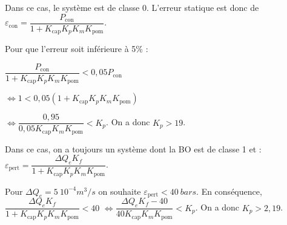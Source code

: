\ifprof
\begin{corrige}
Dans ce cas, le système est de classe 0. L'erreur statique est donc de $\varepsilon_{\text{con}}=\dfrac{P_{\text{con}}}{1+K_{\text{cap}}K_pK_mK_{\text{pom}}}$.
\end{corrige}
\else
\fi

\ifprof
\begin{corrige}

Pour que l'erreur soit inférieure à 5\% : 

$\dfrac{P_{\text{con}}}{1+K_{\text{cap}}K_pK_mK_{\text{pom}}}<0,05 P_{\text{con}}$

$\Leftrightarrow 1<0,05 \left(1+K_{\text{cap}}K_pK_mK_{\text{pom}}\right)$

$\Leftrightarrow \dfrac{0,95}{0,05K_{\text{cap}}K_mK_{\text{pom}}}<K_p$.
On a donc $K_p>19$.
\end{corrige} 
\else
\fi

\ifprof
\begin{corrige}
Dans ce cas, on a toujours un système dont la BO est de classe 1 et : 
$\varepsilon_{\text{pert}}=\dfrac{\Delta Q_e K_f}{1+K_{\text{cap}}K_pK_mK_{\text{pom}}}$.

\end{corrige}
\else
\fi

\ifprof
\begin{corrige}
Pour $\Delta Q_e = \SI{5}{10^{-4} m^3/s}$ on souhaite $\varepsilon_{\text{pert}} < \SI{40}{bars}$. En conséquence, 
$\dfrac{\Delta Q_e K_f}{1+K_{\text{cap}}K_pK_mK_{\text{pom}}} <40$ 
$\Leftrightarrow  \dfrac{\Delta Q_e K_f -40}{40K_{\text{cap}}K_mK_{\text{pom}}}<K_p$. On a donc $K_p>2,19$.
\end{corrige}
\else
\fi

